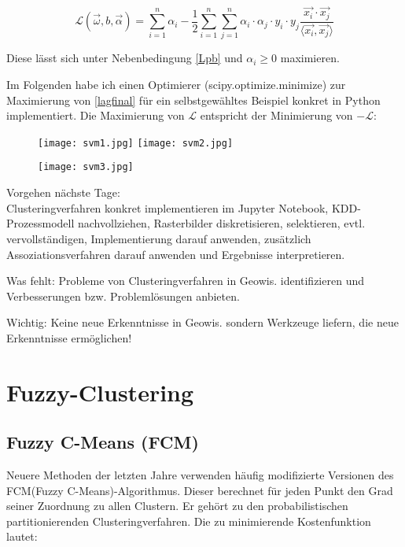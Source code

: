 \documentclass[11pt,ceqn]{book}
\begin{document}
\begin{equation} \label{lagfinal}
\mathcal{L}(\vec{\omega},b,\vec{\alpha}) = \sum_{i=1}^n \alpha_i - \frac{1}{2} \sum_{i=1}^n \sum_{j=1}^n \alpha_i \cdot \alpha_j \cdot y_i \cdot y_j \frac{\vec{x_i} \cdot \vec{x_j}}{ \langle \vec{x_i},  \vec{x_j} \rangle}
\end{equation}

Diese lässt sich unter Nebenbedingung \eqref{Lpb} und $\alpha_i \geqslant 0$ maximieren.

\vspace*{\fill}

Im Folgenden habe ich einen Optimierer (scipy.optimize.minimize) zur Maximierung von \eqref{lagfinal} für ein selbstgewähltes Beispiel konkret in Python implementiert. Die Maximierung von $\mathcal{L}$ entspricht der Minimierung von $-\mathcal{L}$:


\begin{figure}[H]
\centering
\texttt{[image: svm1.jpg]}
\texttt{[image: svm2.jpg]}
\end{figure}
\begin{figure}[H]
\centering
\texttt{[image: svm3.jpg]}
\end{figure}


Vorgehen nächste Tage:\\

Clusteringverfahren konkret implementieren im Jupyter Notebook, KDD-Prozessmodell nachvollziehen, Rasterbilder diskretisieren, selektieren, evtl. vervollständigen, Implementierung darauf anwenden, zusätzlich Assoziationsverfahren darauf anwenden und Ergebnisse interpretieren.

Was fehlt: Probleme von Clusteringverfahren in Geowis. identifizieren und Verbesserungen bzw. Problemlösungen anbieten.

Wichtig: Keine neue Erkenntnisse in Geowis. sondern Werkzeuge liefern, die neue Erkenntnisse ermöglichen!

\section{Fuzzy-Clustering}

\subsection{Fuzzy C-Means (FCM)}
Neuere Methoden der letzten Jahre verwenden häufig modifizierte Versionen des FCM(Fuzzy C-Means)-Algorithmus\cite{clustgis}. Dieser berechnet für jeden Punkt den Grad seiner Zuordnung zu allen Clustern. Er gehört zu den probabilistischen partitionierenden Clusteringverfahren.
Die zu minimierende Kostenfunktion lautet:
\end{document}
